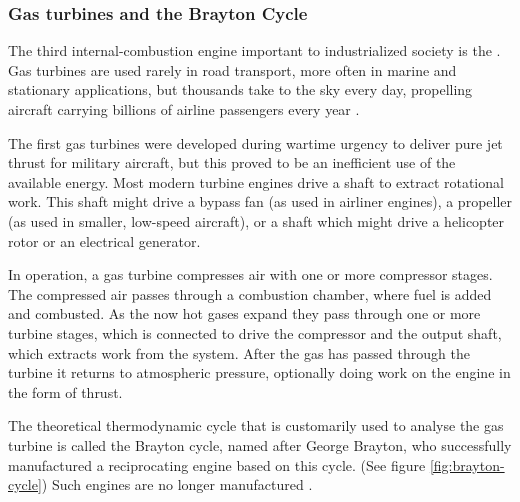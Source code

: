 \subsubsection{Gas turbines and the Brayton Cycle}

The third internal\hyp{}combustion engine important to industrialized society is
the . Gas turbines are used rarely in road transport, more
often in marine and stationary applications, but thousands take to the sky every
day, propelling aircraft carrying billions of airline passengers every year
\autocite{Morris2017}.

The first gas turbines were developed during wartime urgency to deliver pure jet
thrust for military aircraft, but this proved to be an inefficient use of the
available energy. Most modern turbine engines drive a shaft to extract
rotational work. This shaft might drive a bypass fan (as used in airliner engines), a
propeller (as used in smaller, low-speed aircraft), or a shaft which might drive
a helicopter rotor or an electrical generator.

In operation, a gas turbine compresses air with one or more compressor stages.
The compressed air passes through a combustion chamber, where fuel is added and
combusted. As the now hot gases expand they pass through one or more turbine
stages, which is connected to drive the compressor and the output shaft, which
extracts work from the system. After the gas has passed through the turbine it
returns to atmospheric pressure, optionally doing work on the engine in the form
of thrust.

The theoretical thermodynamic cycle that is customarily used to analyse the gas
turbine is called the Brayton cycle, named after George Brayton, who
successfully manufactured a reciprocating engine based on this cycle. (See
figure \ref{fig:brayton-cycle}) Such engines are no longer
manufactured \autocite[Chapter 10]{Cummins1989}.

